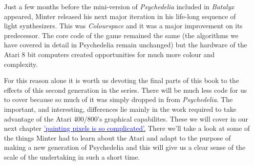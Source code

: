 Just a few months before the mini-version of \textit{Psychedelia} included in \textit{Batalyx} appeared, Minter released
his next major iteration in his life-long sequence of light synthesizers. This was \textit{Colourspace} and it was a major
improvement on its predecessor. The core code of the game remained  the
same (the algorithms we have covered in detail in Psychedelia remain unchanged) but the hardware of the
Atari 8 bit computers created opportunities for much more colour and complexity.

For this reason alone it is worth us devoting the final parts of this book to the effects of this second generation
in the series. There will be much less code for us to cover because so much of it was simply dropped in from 
\textit{Psychedelia}. The important, and interesting, differences lie mainly in the work required to take advantage of the
Atari 400/800's graphical capabilites. These we will cover in our next chapter 
\hyperref[sec:painting]{\textcolor{blue}{'painting pixels is so complicated'.}} 
There we'll take a look at some of the things Minter had to learn about the Atari and adapt
to the purpose of making a new generation of Psychedelia and this will give us a clear sense of 
the scale of the undertaking in such a short time.

